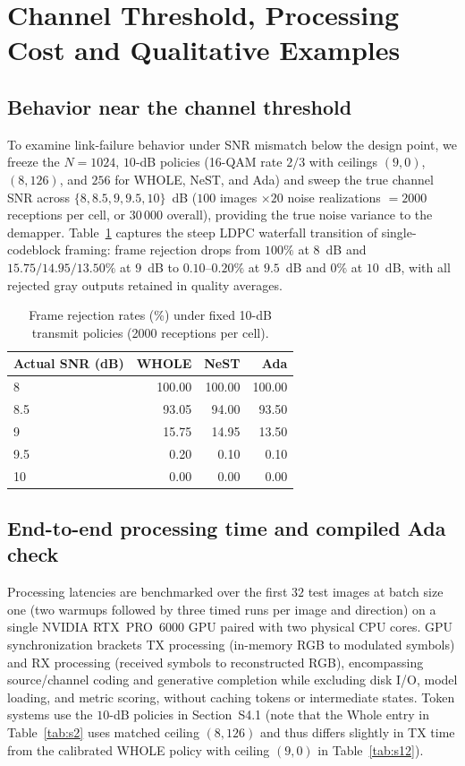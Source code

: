 \documentclass[10pt,letterpaper]{article}
\begin{document}
\section{Channel Threshold, Processing Cost and Qualitative Examples}

\subsection{Behavior near the channel threshold}
To examine link-failure behavior under SNR mismatch below the design point, we freeze the $N=1024$, $10$-dB policies (16-QAM rate $2/3$ with ceilings $(9,0)$, $(8,126)$, and $256$ for WHOLE, NeST, and Ada) and sweep the true channel SNR across $\{8, 8.5, 9, 9.5, 10\}$~dB ($100$ images $\times 20$ noise realizations $=2000$ receptions per cell, or $30\,000$ overall), providing the true noise variance to the demapper. Table~\ref{tab:s11} captures the steep LDPC waterfall transition of single-codeblock framing: frame rejection drops from $100\%$ at $8$~dB and $15.75/14.95/13.50\%$ at $9$~dB to $0.10$--$0.20\%$ at $9.5$~dB and $0\%$ at $10$~dB, with all rejected gray outputs retained in quality averages.

\begin{table}[htbp]
\centering
\caption{Frame rejection rates (\%) under fixed 10-dB transmit policies (2000 receptions per cell).}
\label{tab:s11}
\small
\begin{tabular}{@{}lrrr@{}}
\toprule
Actual SNR (dB) & WHOLE & NeST & Ada\\
\midrule
8   & 100.00 & 100.00 & 100.00\\
8.5 &  93.05 &  94.00 &  93.50\\
9   &  15.75 &  14.95 &  13.50\\
9.5 &   0.20 &   0.10 &   0.10\\
10  &   0.00 &   0.00 &   0.00\\
\bottomrule
\end{tabular}
\end{table}

\subsection{End-to-end processing time and compiled Ada check}
Processing latencies are benchmarked over the first $32$ test images at batch size one (two warmups followed by three timed runs per image and direction) on a single NVIDIA RTX~PRO~6000 GPU paired with two physical CPU cores. GPU synchronization brackets TX processing (in-memory RGB to modulated symbols) and RX processing (received symbols to reconstructed RGB), encompassing source/channel coding and generative completion while excluding disk I/O, model loading, and metric scoring, without caching tokens or intermediate states. Token systems use the $10$-dB policies in Section~S4.1 (note that the Whole entry in Table~\ref{tab:s2} uses matched ceiling $(8,126)$ and thus differs slightly in TX time from the calibrated WHOLE policy with ceiling $(9,0)$ in Table~\ref{tab:s12}).
\end{document}
